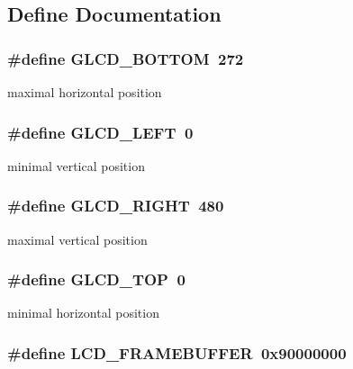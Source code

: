 \subsection{Define Documentation}
\hypertarget{group__ap7000__lcd_g5472b3d9706ac3335f1f22b0cdd6d18f}{
\subsubsection[{GLCD\_\-BOTTOM}]{\setlength{\rightskip}{0pt plus 5cm}\#define GLCD\_\-BOTTOM~272}}
\label{group__ap7000__lcd_g5472b3d9706ac3335f1f22b0cdd6d18f}


maximal horizontal position \hypertarget{group__ap7000__lcd_g4a20e62f00af437f0751229dbe5f155c}{
\subsubsection[{GLCD\_\-LEFT}]{\setlength{\rightskip}{0pt plus 5cm}\#define GLCD\_\-LEFT~0}}
\label{group__ap7000__lcd_g4a20e62f00af437f0751229dbe5f155c}


minimal vertical position \hypertarget{group__ap7000__lcd_g159d4b69cc8ba37f5e689e1ca132add6}{
\subsubsection[{GLCD\_\-RIGHT}]{\setlength{\rightskip}{0pt plus 5cm}\#define GLCD\_\-RIGHT~480}}
\label{group__ap7000__lcd_g159d4b69cc8ba37f5e689e1ca132add6}


maximal vertical position \hypertarget{group__ap7000__lcd_gf2ee96404297ed47a1437012251aaf08}{
\subsubsection[{GLCD\_\-TOP}]{\setlength{\rightskip}{0pt plus 5cm}\#define GLCD\_\-TOP~0}}
\label{group__ap7000__lcd_gf2ee96404297ed47a1437012251aaf08}


minimal horizontal position \hypertarget{group__ap7000__lcd_gcf3edd4d44a99cff73b884e9ab496718}{
\subsubsection[{LCD\_\-FRAMEBUFFER}]{\setlength{\rightskip}{0pt plus 5cm}\#define LCD\_\-FRAMEBUFFER~0x90000000}}
\label{group__ap7000__lcd_gcf3edd4d44a99cff73b884e9ab496718}


